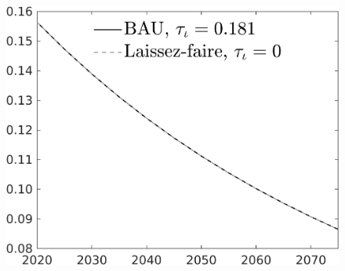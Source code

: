 \documentclass[12pt]{article}
\begin{document}
\begin{figure}[h!!]
\begin{minipage}[]{0.32\textwidth}
	\end{minipage}	
	\begin{minipage}[]{0.32\textwidth}
		\includegraphics[width=1\textwidth]{../../codding_model/own_basedOnFried/optimalPol_010922_revision/figures/all_13Sept22/CompTaul_LFBAU_Reg0_LgLf_spillover0_nsk1_xgr0_knspil1_sep1_countec0_GovRev0_etaa0.79_lgd1.png}
	\end{minipage}	
\end{figure}
\end{document}
